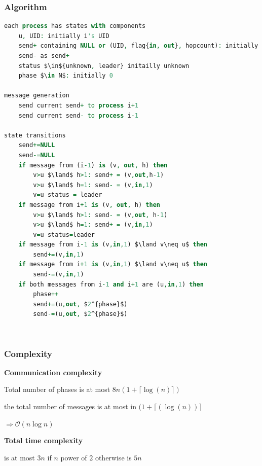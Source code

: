 \subsubsection{Algorithm}
\begin{lstlisting}[mathescape, language=VHDL]
each process has states with components
	u, UID: initially i's UID
	send+ containing NULL or (UID, flag{in, out}, hopcount): initially (i's UID, out, 1)
	send- as send+
	status $\in${unknown, leader} initailly unknown 
	phase $\in N$: initially 0

message generation
	send current send+ to process i+1
	send current send- to process i-1

state transitions
	send+=NULL
	send-=NULL
	if message from (i-1) is (v, out, h) then
		v>u $\land$ h>1: send+ = (v,out,h-1)
		v>u $\land$ h=1: send- = (v,in,1)
		v=u status = leader
	if message from i+1 is (v, out, h) then
		v>u $\land$ h>1: send- = (v,out, h-1)
		v>u $\land$ h=1: send+ = (v,in,1)
		v=u status=leader
	if message from i-1 is (v,in,1) $\land v\neq u$ then
		send+=(v,in,1)
	if message from i+1 is (v,in,1) $\land v\neq u$ then
		send-=(v,in,1)
	if both messages from i-1 and i+1 are (u,in,1) then
		phase++
		send+=(u,out, $2^{phase}$)
		send-=(u,out, $2^{phase}$)
\end{lstlisting}
\ \\

\subsubsection{Complexity}
\begin{compactitem}
	\item \textbf{Communication complexity}
	\begin{compactitem}
		\item Total number of phases is at most $8n(1+\lceil\log(n)\rceil)$
		\item the total number of messages is at most in $(1+\lceil(\log(n))\rceil$	
		\item $\Rightarrow \mathcal{O}(n\log n)$
	\end{compactitem}
	\item \textbf{Total time complexity}
	\begin{compactitem}
		\item is at most $3n$ if $n$ power of $2$ otherwise is $5n$	
	\end{compactitem}
\end{compactitem}




